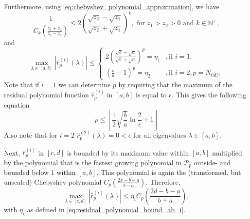 Furthermore, using \cref{eq:chebyshev_polynomial_approximation}, we have
\begin{equation}
    \frac{1}{C_{k}\left(\frac{z_1 + z_2}{z_1 - z_2}\right)} \leq 2 \left(\frac{\sqrt{z_2} - \sqrt{z_1}}{\sqrt{z_2} + \sqrt{z_1}}\right)^k, \text{ for } z_1 > z_2 > 0 \text{ and } k \in \mathbb{N}^+,
    \label{eq:chebyshev_polynomial_bound}
\end{equation}
and
\begin{equation}
    \max_{\lambda \in [a,b]} |\hat{r}^{(i)}_p(\lambda)| \leq
    \begin{cases}
        2\left(\frac{\sqrt{b}-\sqrt{a}}{\sqrt{b}+\sqrt{a}}\right)^p=\eta_1 & , \text{if } i = 1,                      \\
        \left(\frac{b}{a}-1\right)^p=\eta_2                                & , \text{if } i = 2, p = N_{\text{tail}},
    \end{cases}
    \label{eq:residual_polynomial_bound_ab_i}
\end{equation}
Note that if $i=1$ we can determine $p$ by requiring that the maximum of the residual polynomial function $\hat{r}^{(i)}_p$ in $[a,b]$ is equal to $\epsilon$. This gives the following equation
\begin{equation}
    p \leq \left\lfloor\frac{1}{2}\sqrt{\frac{b}{a}}\ln{\frac{2}{\epsilon}} + 1\right\rfloor
    \label{eq:chebyshev_degree_p}
\end{equation}
Also note that for $i=2$ $\hat{r}^{(2)}_p(\lambda) = 0 < \epsilon$ for all eigenvalues $\lambda \in [a,b]$.

Next, $\hat{r}^{(i)}_p$ in $[c,d]$ is bounded by its maximum value within $[a,b]$ multiplied by the polynomial that is the fastest growing polynomial in $\mathcal{P}_{p}$ outside- and bounded below 1 within $[a,b]$. This polynomial is again the (transformed, but unscaled) Chebyshev polynomial $C_{p}\left(\frac{2x - b - a}{b - a}\right)$. Therefore,
\begin{equation*}
    \max_{\lambda \in [c,d]} |\hat{r}^{(i)}_p(\lambda)| \leq \eta_i C_{p}\left(\frac{2d - b - a}{b + a}\right),
\end{equation*}
with $\eta_i$ as defined in \cref{eq:residual_polynomial_bound_ab_i}.

